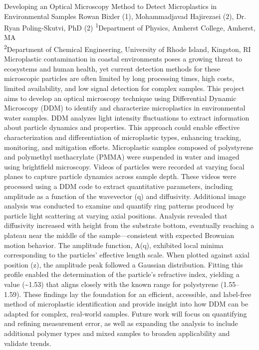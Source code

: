 \makeabstract
{
Developing an Optical Microscopy Method to Detect Microplastics in Environmental Samples
}
{
Rowan Bixler (1), Mohammadjavad Hajirezaei (2), Dr. Ryan Poling-Skutvi, PhD (2)
}
{
\textsuperscript{1}Department of Physics, Amherst College, Amherst, MA\\
\textsuperscript{2}Department of Chemical Engineering, University of Rhode Island, Kingston, RI
}
{
Microplastic contamination in coastal environments poses a growing threat to ecosystems and human health, yet current detection methods for these microscopic particles are often limited by long processing times, high costs, limited availability, and low signal detection for complex samples. This project aims to develop an optical microscopy technique using Differential Dynamic Microscopy (DDM) to identify and characterize microplastics in environmental water samples. DDM analyzes light intensity fluctuations to extract information about particle dynamics and properties. This approach could enable effective characterization and differentiation of microplastic types, enhancing tracking, monitoring, and mitigation efforts.
}
{
Microplastic samples composed of polystyrene and polymethyl methacrylate (PMMA) were suspended in water and imaged using brightfield microscopy. Videos of particles were recorded at varying focal planes to capture particle dynamics across sample depth. These videos were processed using a DDM code to extract quantitative parameters, including amplitude as a function of the wavevector (q) and diffusivity. Additional image analysis was conducted to examine and quantify ring patterns produced by particle light scattering at varying axial positions.
}
{
Analysis revealed that diffusivity increased with height from the substrate bottom, eventually reaching a plateau near the middle of the sample—consistent with expected Brownian motion behavior. The amplitude function, A(q), exhibited local minima corresponding to the particles’ effective length scale. When plotted against axial position (z), the amplitude peak followed a Gaussian distribution. Fitting this profile enabled the determination of the particle’s refractive index, yielding a value (\textasciitilde{}1.53) that aligns closely with the known range for polystyrene (1.55–1.59).
}
{
These findings lay the foundation for an efficient, accessible, and label-free method of microplastic identification and provide insight into how DDM can be adapted for complex, real-world samples. Future work will focus on quantifying and refining measurement error, as well as expanding the analysis to include additional polymer types and mixed samples to broaden applicability and validate trends.
}

\newpage
